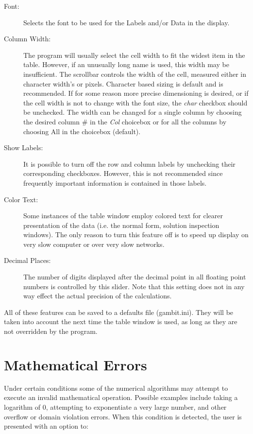 \begin{description}
\item[Font:] Selects the font to be used for the Labels and/or Data in
the display.
\item[Column Width:] The program will usually select the cell width to
fit the widest item in the table.  However, if an unusually long name
is used, this width may be insufficient.  The scrollbar controls the
width of the cell, measured either in character width's or pixels.
Character based sizing is default and is recommended.  If for some
reason more precise dimensioning is desired, or if the cell width is
not to change with the font size, the {\em char} checkbox should be
unchecked.  The width can be changed for a single column by choosing
the desired column \# in the {\em Col} choicebox or for all the
columns by choosing All in the choicebox (default).
\item[Show Labels:] It is possible to turn off the row and column
labels by unchecking their corresponding checkboxes.  However, this is
not recommended since frequently important information is contained in
those labels.
\item[Color Text:] Some instances of the table window employ colored
text for clearer presentation of the data (i.e. the normal form,
solution inspection windows).  The only reason to turn this feature
off is to speed up display on very slow computer or over very slow
networks.
\item[Decimal Places:] The number of digits displayed after the
decimal point in all floating point numbers is controlled by this
slider.  Note that this setting does not in any way effect the actual
precision of the calculations.
\end{description}

All of these features can be saved to a defaults file (gambit.ini).  They
will be taken into account the next time the table window is used, as long
as they are not overridden by the program.

\section{Mathematical Errors}
Under certain conditions some of the numerical algorithms may attempt to
execute an invalid mathematical operation.  Possible examples include
taking a logarithm of 0, attempting to exponentiate a very large number, and
other overflow or domain violation errors.  When this condition is detected,
the user is presented with an option to:

